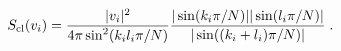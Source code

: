 \begin{equation}
S_{\rm cl}(v_i)= {\vert v_i\vert^2  \over 4\pi \sin^2(k_i l_i \pi/N)}
{\vert \sin(k_i \pi/N)\vert \vert \sin(l_i\pi/N)\vert \over
\vert \sin((k_i+l_i)\pi/N)\vert} \;.
\end{equation}

